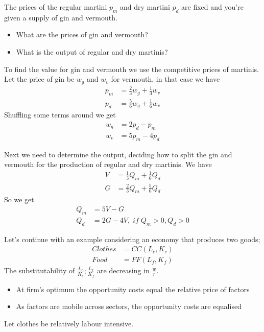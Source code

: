 \documentclass{beamer}
\begin{document}
\begin{frame}
The prices of the regular martini $p_m$ and dry martini $p_d$ are fixed and you're given a supply of gin and vermouth.
 \begin{itemize}
   \item What are the prices of gin and vermouth?
   \item What is the output of regular and dry martinis?
 \end{itemize}
\end{frame}

\begin{frame}
  To find the value for gin and vermouth we use the competitive prices of martinis.
  Let the price of gin be $w_g$ and $w_v$ for vermouth, in that case we have
  \begin{align*}
    p_m &= \frac{2}{3}w_g + \frac{1}{3}w_v\\
    p_d &= \frac{5}{6}w_g + \frac{1}{6}w_v
   \end{align*} 
   \medskip 
   Shuffling some terms around we get
   \begin{align*}
    w_g &= 2p_d - p_m\\
    w_v &= 5p_m - 4 p_d
   \end{align*}
\end{frame}

\begin{frame}
 Next we need to determine the output, deciding how to split the gin and vermouth for the production of regular and dry martinis.
 We have
 \begin{align*}
 V &= \frac{1}{3}Q_m + \frac{1}{6}Q_d\\
 G &= \frac{2}{3}Q_m + \frac{5}{6}Q_d
 \end{align*}
  So we get
  \begin{align*}
  Q_m &= 5V-G\\
  Q_d &= 2G-4V,\; if \; Q_m>0, Q_d>0
  \end{align*}
\end{frame}

\begin{frame}
  Let's continue with an example considering an economy that produces two goods;   
  \begin{align*}
    Clothes&=CC(L_c,K_c)\\
    Food&=FF(L_f,K_f)
  \end{align*}
  \medskip
  The substitutability of $\frac{L_c}{K_c};\frac{L_f}{K_f}$ are decreasing in $\frac{w}{r}$.
  \begin{itemize}
    \item At firm's optimum the opportunity costs equal the relative price of factors
    \item As factors are mobile across sectors, the opportunity costs are equalised
  \end{itemize}  
  \medskip
  Let clothes be relatively labour intensive.
\end{frame}
\end{document}
